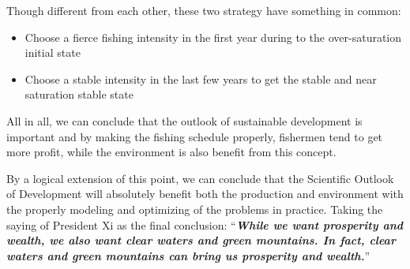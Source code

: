 \documentclass{IEEEtran}
\begin{document}
Though different from each other, these two strategy have something in common:

\begin{itemize}
    \item {Choose a fierce fishing intensity in the first year during to the over-saturation initial state}
    \item {Choose a stable intensity in the last few years to get the stable and near saturation stable state}
\end{itemize}

All in all, we can conclude that the outlook of sustainable development is important and by making the fishing schedule properly, fishermen tend to get more profit, while the environment is also benefit from this concept.

By a logical extension of this point, we can conclude that the Scientific Outlook of Development will absolutely benefit both the production and environment with the properly modeling and optimizing of the problems in practice. Taking the saying of President Xi as the final conclusion: ``\textbf{\textit{While we want prosperity and wealth, we also want clear waters and green mountains. In fact, clear waters and green mountains can bring us prosperity and wealth.}}''




\end{document}
